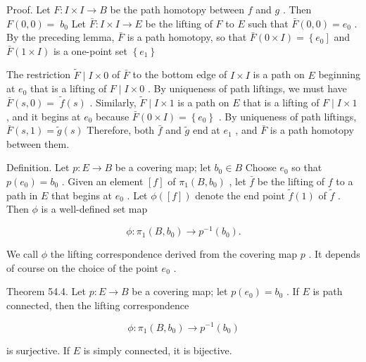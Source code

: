 \documentclass[10pt]{article}
\begin{document}
Proof. Let \(F : I \times  I \rightarrow  B\) be the path homotopy between \(f\) and \(g\) . Then \(F\left( {0,0}\right)  = \; {b}_{0}\) Let \(\bar{F} : I \times  I \rightarrow  E\) be the lifting of \(F\) to \(E\) such that \(\bar{F}\left( {0,0}\right)  = {e}_{0}\) . By the preceding lemma, \(\bar{F}\) is a path homotopy, so that \(\bar{F}\left( {0 \times  I}\right)  = \left\{  {e}_{0}\right\rbrack\) and \(\bar{F}\left( {1 \times  I}\right)\) is a one-point set \(\left\{  {e}_{1}\right\}\)

The restriction \(\widetilde{F} \mid  I \times  0\) of \(\bar{F}\) to the bottom edge of \(I \times  I\) is a path on \(E\) beginning at \({e}_{0}\) that is a lifting of \(F \mid  I \times  0\) . By uniqueness of path liftings, we must have \(\bar{F}\left( {s,0}\right)  = \; \widetilde{f}\left( s\right)\) . Similarly, \(\widetilde{F} \mid  I \times  1\) is a path on \(E\) that is a lifting of \(F \mid  I \times  1\) , and it begins at \({e}_{0}\) because \(\bar{F}\left( {0 \times  I}\right)  = \left\{  {e}_{0}\right\}\) . By uniqueness of path liftings, \(\bar{F}\left( {s,1}\right)  = \widetilde{g}\left( s\right)\) Therefore, both \(\bar{f}\) and \(\widetilde{g}\) end at \({e}_{1}\) , and \(\bar{F}\) is a path homotopy between them.

Definition. Let \(p : E \rightarrow  B\) be a covering map; let \({b}_{0} \in  B\) Choose \({e}_{0}\) so that \(p\left( {e}_{0}\right)  = {b}_{0}\) . Given an element \(\left\lbrack  f\right\rbrack\) of \({\pi }_{1}\left( {B,{b}_{0}}\right)\) , let \(\bar{f}\) be the lifting of \(f\) to a path in \(E\) that begins at \({e}_{0}\) . Let \(\phi \left( \left\lbrack  f\right\rbrack  \right)\) denote the end point \(\widetilde{f}\left( 1\right)\) of \(\widetilde{f}\) . Then \(\phi\) is a well-defined set map

\[
\phi  : {\pi }_{1}\left( {B,{b}_{0}}\right)  \rightarrow  {p}^{-1}\left( {b}_{0}\right) .
\]

We call \(\phi\) the lifting correspondence derived from the covering map \(p\) . It depends of course on the choice of the point \({e}_{0}\) .

Theorem 54.4. Let \(p : E \rightarrow  B\) be a covering map; let \(p\left( {e}_{0}\right)  = {b}_{0}\) . If \(E\) is path connected, then the lifting correspondence

\[
\phi  : {\pi }_{1}\left( {B,{b}_{0}}\right)  \rightarrow  {p}^{-1}\left( {b}_{0}\right)
\]

is surjective. If \(E\) is simply connected, it is bijective.
\end{document}
